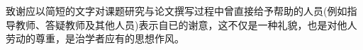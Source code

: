 \neeputanks
\bodystyle
致谢应以简短的文字对课题研究与论文撰写过程中曾直接给予帮助的人员(例如指导教师、答疑教师及其他人员)表示自已的谢意，这不仅是一种礼貌，也是对他人劳动的尊重，是治学者应有的思想作风。\par
